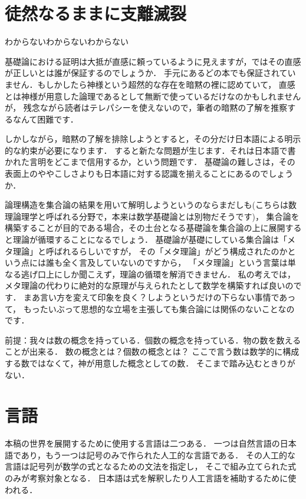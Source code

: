 \documentclass[a4j,10.5pt,oneside,openany]{jsbook}
\theoremstyle{mystyle}
\begin{document}

\section{徒然なるままに支離滅裂}
わからないわからないわからない

基礎論における証明は大抵が直感に頼っているように見えますが，ではその直感が正しいとは誰が保証するのでしょうか．
手元にあるどの本でも保証されていません．もしかしたら神様という超然的な存在を暗黙の裡に認めていて，
直感とは神様が用意した論理であるとして無断で使っているだけなのかもしれませんが，
残念ながら読者はテレパシーを使えないので，筆者の暗黙の了解を推察するなんて困難です．

しかしながら，暗黙の了解を排除しようとすると，その分だけ日本語による明示的な約束が必要になります．
すると新たな問題が生じます．それは日本語で書かれた言明をどこまで信用するか，という問題です．
基礎論の難しさは，その表面上のややこしさよりも日本語に対する認識を揃えることにあるのでしょうか．

論理構造を集合論の結果を用いて解明しようというのならまだしも(こちらは数理論理学と呼ばれる分野で，本来は数学基礎論とは別物だそうです)，
集合論を構築することが目的である場合，その土台となる基礎論を集合論の上に展開すると理論が循環することになるでしょう．
基礎論が基礎にしている集合論は「メタ理論」と呼ばれるらしいですが，
その「メタ理論」がどう構成されたのかという点には誰も全く言及していないのですから，
「メタ理論」という言葉は単なる逃げ口上にしか聞こえず，理論の循環を解消できません．
私の考えでは，メタ理論の代わりに絶対的な原理が与えられたとして数学を構築すれば良いのです．
まあ言い方を変えて印象を良く？しようというだけの下らない事情であって，
もったいぶって思想的な立場を主張しても集合論には関係のないことなのです．

前提：我々は数の概念を持っている．個数の概念を持っている．物の数を数えることが出来る．
数の概念とは？個数の概念とは？
ここで言う数は数学的に構成する数ではなくて，神が用意した概念としての数．
そこまで踏み込むときりがない．

\section{言語}
	本稿の世界を展開するために使用する言語は二つある．
	一つは自然言語の日本語であり，もう一つは記号のみで作られた人工的な言語である．
	その人工的な言語は記号列が数学の式となるための文法を指定し，
	そこで組み立てられた式のみが考察対象となる．
	日本語は式を解釈したり人工言語を補助するために使われる．
	
\end{document}
